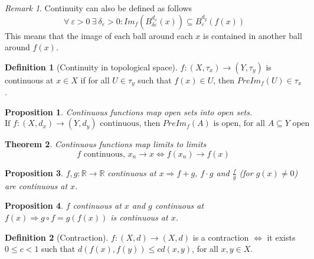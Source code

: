 \documentclass{article}
\newcommand{\Ar}{\Rightarrow}
\newcommand{\fr}[2]{\frac{#1}{#2}}
\newcommand{\f}[3]{#1 : #2 \rightarrow #3}
\newcommand{\fOnR}[1]{#1 : \mathbb{R} \rightarrow \mathbb{R}}
\theoremstyle{definition}
\newtheorem{definition}{Definition}[section]
\theoremstyle{definition}
\theoremstyle{plain}
\newtheorem{theorem}{Theorem}[section]
\theoremstyle{plain}
\theoremstyle{plain}
\theoremstyle{plain}
\newtheorem{proposition}[theorem]{Proposition}
\theoremstyle{definition}
\theoremstyle{remark}
\theoremstyle{remark}
\theoremstyle{remark}
\theoremstyle{remark}
\newtheorem*{remark}{Remark}
\newcommand{\ForAll}{\ \forall \ }
\newcommand{\Exists}{\ \exists \ }
\newcommand{\E}{\varepsilon}
\begin{document}
\begin{remark}
  Continuity can also be defined as follows
  \[
    \ForAll \E > 0 \Exists \delta_\E > 0 :
    Im_f(B_{\delta\E}^{d_x}(x)) \subseteq B_\E^{d_y}(f(x))
  \]
  This means that the image of each ball around each $x$ is contained in another ball around $f(x)$.
\end{remark}


\begin{definition}[Continuity in topological space]
  $\f{f}{(X,\tau_x)}{(Y,\tau_y)}$ is continuous at $x \in X$ if for all $U \in \tau_y$ such that $f(x) \in U$, then $PreIm_f(U) \in \tau_x$.
\end{definition}



\begin{proposition}
  Continuous functions map open sets into open sets.
  \[
  \text{If } \f{f}{(X,d_x)}{(Y,d_y)} \text{ continuous, then } PreIm_f(A) \text{ is open, for all } A \subseteq Y \text{ open}
  \]
\end{proposition}



\begin{theorem}
  Continuous functions map limits to limits
  \[
    f \text{ continuous, } x_n \to x \iff f(x_n) \to f(x)
  \]
\end{theorem}





\begin{proposition}
  $\fOnR{f,g}$ continuous at $x \Ar f+g$, $f \cdot g$ and $\fr{f}{g}$ (for $g(x) \neq 0$) are continuous at $x$.
\end{proposition}


\begin{proposition}
  $f$ continuous at $x$ and $g$ continuous at $f(x) \Ar g \circ f = g(f(x))$ is continuous at $x$.
\end{proposition}



\begin{definition}[Contraction]
  $\f{f}{(X,d)}{(X,d)}$ is a contraction $\iff$ it exists $0 \leq c < 1$ such that $d(f(x),f(y)) \leq cd(x,y)$, for all $x,y \in X$.
\end{definition}
\end{document}
